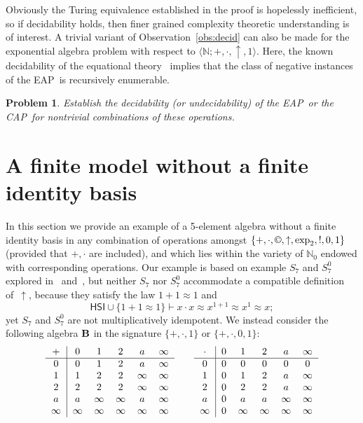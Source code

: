 \documentclass[eqnor,reqno]{amsart}
\theoremstyle{plain}
\newtheorem{problem}[thm]{Problem}
\theoremstyle{definition}
\newcommand{\cc}{\mathbin{\textup{\copyright}}}
\newcommand{\up}[1]{\textup{#1}}
\newcommand{\HSI}{\textsf{HSI}}
\newcommand{\EAP}{\textsf{EAP}}
\newcommand{\CAP}{\textsf{CAP}}
\begin{document}
Obviously the Turing equivalence established in the proof is hopelessly inefficient, so if decidability holds, then finer grained complexity theoretic understanding is of interest.
A trivial variant of Observation~\ref{obs:decid} can also be made for the exponential algebra problem with respect to $\langle \mathbb{N};+,\cdot,\uparrow,1\rangle$.  Here, the known decidability of the equational theory~\cite{mac} implies that the class of negative instances of the \EAP\ is recursively enumerable.  
\begin{problem}
Establish the decidability \up(or undecidability\up) of the  \EAP\ or the \CAP\ for nontrivial combinations of these operations.
\end{problem}

\section{A finite model without a finite identity basis}\label{sec:A}
In this section we provide an example of a 5-element algebra without a finite identity basis in any combination of operations amongst $\{+,\cdot,\cc,\uparrow,\exp_2,!,0,1\}$ (provided that $+,\cdot$ are included), and which lies within the variety of $\mathbb{N}_0$ endowed with corresponding operations.  Our example is based on example $S_7$ and $S_7^0$ explored in~\cite{JRZ} and~\cite{WRZ}, but neither $S_7$ nor $S_7^0$ accommodate a compatible definition of~$\uparrow$, because they satisfy the law $1+1\approx 1$ and 
\[
{\HSI}\cup\{1+1\approx 1\}\vdash x\cdot x\approx x^{1+1}\approx x^1\approx x;
\] 
yet $S_7$ and $S_7^0$ are not multiplicatively idempotent.  We instead consider the following algebra ${\bf B}$ in the signature $\{+,\cdot,1\}$ or $\{+,\cdot,0,1\}$:
\[
\begin{tabular}{c|ccccc}
$+$&$0$&$1$&$2$&$a$&$\infty$\\
\hline
0&0&1&$2$&$a$&$\infty$\\
1&1&2&$2$&$\infty$&$\infty$\\
2&2&2&$2$&$\infty$&$\infty$\\
$a$&$a$&$\infty$&$\infty$&$a$&$\infty$\\
$\infty$&$\infty$&$\infty$&$\infty$&$\infty$&$\infty$\\
\end{tabular}\qquad
\begin{tabular}{c|ccccc}
$\cdot$&$0$&$1$&$2$&$a$&$\infty$\\
\hline
0&0&0&0&0&0\\
1&0&1&$2$&$a$&$\infty$\\
2&0&2&$2$&$a$&$\infty$\\
$a$&0&$a$&$a$&$\infty$&$\infty$\\
$\infty$&0&$\infty$&$\infty$&$\infty$&$\infty$\\
\end{tabular}
\]
\end{document}
